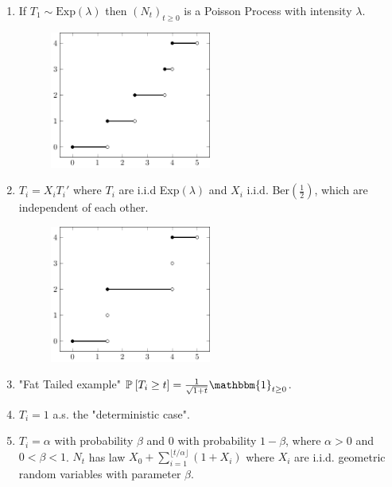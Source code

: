 \begin{ex}[]
	\begin{enumerate}
		\item If $T_1 \sim  \textrm{Exp}(\lambda )$ then $(N_t)_{t\geq 0}$ is a 
Poisson Process with intensity $\lambda$.
\begin{figure}[h]
\centering
\includegraphics[width=0.5\textwidth]{figures/plots/renewal1.pdf}
\end{figure}

\item $T_i = X_i T_i'$ where  $T_i$ are i.i.d Exp$(\lambda)$ and $X_i$ i.i.d. Ber$(\frac{1}{2})$, which are independent of each other.
\begin{figure}[h]
\centering
\includegraphics[width=0.5\textwidth]{figures/plots/renewal2.pdf}
\end{figure}

\item "Fat Tailed example" $\mathbb{P}_{} \left[ T_i \geq t \right] = \frac{1}{\sqrt{1+t}}\mathbbm{1}_{t\geq 0} $.
\item $T_i = 1$ a.s. the "deterministic case".
\item $T_i = \alpha $ with probability $\beta $ and $0$ with probability $1-\beta $, where $\alpha > 0$ and $0< \beta <1$. $N_t$ has law $X_0 + \sum_{i=1}^{\lfloor t/\alpha \rfloor}(1+X_i) $ where $X_i$ are i.i.d. geometric random variables with parameter  $\beta $.
	\end{enumerate}
\end{ex}

